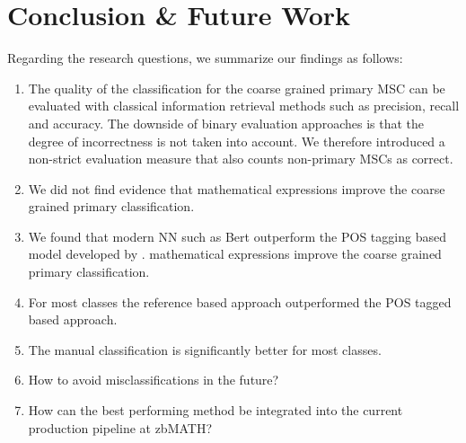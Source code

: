 \section{Conclusion \& Future Work}\label{sec.concl}
Regarding the research questions, we summarize our findings as follows:
\begin{enumerate}
  \item The quality of the classification for the coarse grained primary MSC can be evaluated with classical information retrieval methods such as precision, recall and accuracy. The downside of binary evaluation approaches is that the degree of incorrectness is not taken into account. We therefore introduced a non-strict evaluation measure that also counts non-primary MSCs as correct.
  \item We did not find evidence that mathematical expressions improve the coarse grained primary classification.
  \item We found that modern NN such as Bert outperform the POS tagging based model developed by \cite{SchonebergS14}. mathematical expressions improve the coarse grained primary classification.
  \item For most classes the reference based approach outperformed the POS tagged based approach.
  \item The manual classification is significantly better for most classes. 
  \item How to avoid misclassifications in the future?
  \item How can the best performing method be integrated into the current production pipeline at zbMATH?
\end{enumerate}
\printbibliography[keyword=primary]